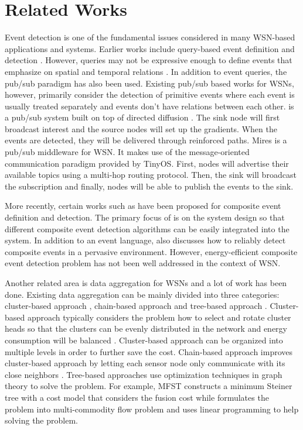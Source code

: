 \section{Related Works}
\label{sec:relatedworks}
Event detection is one of the fundamental issues considered in many WSN-based applications and systems. Earlier works include query-based event definition and detection \cite{reed, tinydb}. However, queries may not be expressive enough to define events that emphasize on spatial and temporal relations \cite{cougar}. In addition to event queries, the pub/sub paradigm has also been used.  Existing pub/sub based works for WSNs, however, primarily consider the detection of primitive events where each event is usually treated separately and events don't have relations between each other. \cite{lowlevelnaming} is a pub/sub system built on top of directed diffusion \cite{directeddiffusion}. The sink node will first broadcast interest and the source nodes will set up the gradients. When the events are detected, they will be delivered through reinforced paths. Mires \cite{mires} is a pub/sub middleware for WSN. It makes use of the message-oriented communication paradigm provided by TinyOS. First, nodes will advertise their available topics using a multi-hop routing protocol. Then, the sink will broadcast the subscription and finally, nodes will be able to publish the events to the sink.

More recently, certain works such as \cite{lai:psware, complexevent} have been proposed for composite event definition and detection. The primary focus of \cite{lai:psware} is on the system design so that different composite event detection algorithms can be easily integrated into the system. In addition to an event language, \cite{complexevent} also discusses how to reliably detect composite events in a pervasive environment. However, energy-efficient composite event detection problem has not been well addressed in the context of WSN.

Another related area is data aggregation for WSNs and a lot of work has been done. Existing data aggregation can be mainly divided into three categories: cluster-based approach \cite{leach}, chain-based approach \cite{pegasis} and tree-based approach \cite{mfst, xue:lp}.  Cluster-based approach typically considers the problem how to select and rotate cluster heads so that the clusters can be evenly distributed in the network and energy consumption will be balanced \cite{leach}. Cluster-based approach can be organized into multiple levels in order to further save the cost. Chain-based approach improves cluster-based approach by letting each sensor node only communicate with its close neighbors \cite{pegasis}. Tree-based approaches use optimization techniques in graph theory to solve the problem. For example, MFST \cite{mfst} constructs a minimum Steiner tree with a cost model that considers the fusion cost while \cite{xue:lp} formulates the problem into multi-commodity flow problem and uses linear programming to help solving the problem.

